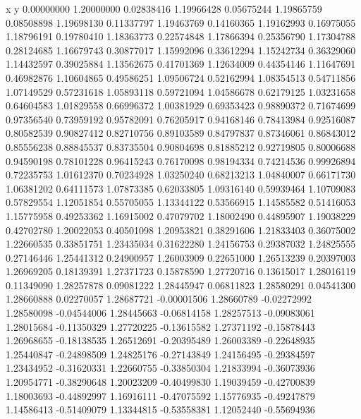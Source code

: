 x y       
0.00000000   1.20000000  
0.02838416   1.19966428  
0.05675244   1.19865759  
0.08508898   1.19698130  
0.11337797   1.19463769  
0.14160365   1.19162993  
0.16975055   1.18796191  
0.19780410   1.18363773  
0.22574848   1.17866394  
0.25356790   1.17304788  
0.28124685   1.16679743  
0.30877017   1.15992096  
0.33612294   1.15242734  
0.36329060   1.14432597  
0.39025884   1.13562675  
0.41701369   1.12634009  
0.44354146   1.11647691  
0.46982876   1.10604865  
0.49586251   1.09506724  
0.52162994   1.08354513  
0.54711856   1.07149529  
0.57231618   1.05893118  
0.59721094   1.04586678  
0.62179125   1.03231658  
0.64604583   1.01829558  
0.66996372   1.00381929  
0.69353423   0.98890372  
0.71674699   0.97356540  
0.73959192   0.95782091  
0.76205917   0.94168146  
0.78413984   0.92516087  
0.80582539   0.90827412  
0.82710756   0.89103589  
0.84797837   0.87346061  
0.86843012   0.85556238  
0.88845537   0.83735504  
0.90804698   0.81885212  
0.92719805   0.80006688  
0.94590198   0.78101228  
0.96415243   0.76170098  
0.98194334   0.74214536  
0.99926894   0.72235753  
1.01612370   0.70234928  
1.03250240   0.68213213  
1.04840007   0.66171730  
1.06381202   0.64111573  
1.07873385   0.62033805  
1.09316140   0.59939464  
1.10709083   0.57829554  
1.12051854   0.55705055  
1.13344122   0.53566915  
1.14585582   0.51416053  
1.15775958   0.49253362  
1.16915002   0.47079702  
1.18002490   0.44895907  
1.19038229   0.42702780  
1.20022053   0.40501098  
1.20953821   0.38291606  
1.21833403   0.36075002  
1.22660535   0.33851751  
1.23435034   0.31622280  
1.24156753   0.29387032  
1.24825555   0.27146446  
1.25441312   0.24900957  
1.26003909   0.22651000  
1.26513239   0.20397003  
1.26969205   0.18139391  
1.27371723   0.15878590  
1.27720716   0.13615017  
1.28016119   0.11349090  
1.28257878   0.09081222  
1.28445947   0.06811823  
1.28580291   0.04541300  
1.28660888   0.02270057  
1.28687721   -0.00001506 
1.28660789   -0.02272992 
1.28580098   -0.04544006 
1.28445663   -0.06814158 
1.28257513   -0.09083061 
1.28015684   -0.11350329 
1.27720225   -0.13615582 
1.27371192   -0.15878443 
1.26968655   -0.18138535 
1.26512691   -0.20395489 
1.26003389   -0.22648935 
1.25440847   -0.24898509 
1.24825176   -0.27143849 
1.24156495   -0.29384597 
1.23434952   -0.31620331 
1.22660755   -0.33850304 
1.21833994   -0.36073936 
1.20954771   -0.38290648 
1.20023209   -0.40499830 
1.19039459   -0.42700839 
1.18003693   -0.44892997 
1.16916111   -0.47075592 
1.15776935   -0.49247879 
1.14586413   -0.51409079 
1.13344815   -0.53558381 
1.12052440   -0.55694936 
